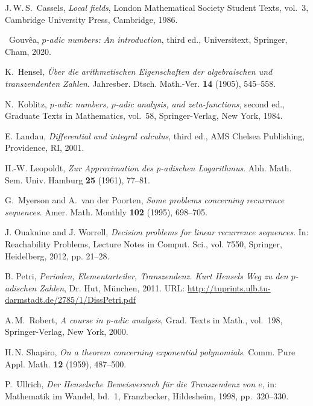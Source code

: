 \let\oldaddcontentsline\addcontentsline
\renewcommand{\addcontentsline}[3]{}
\begin{thebibliography}{11}



 {J.\,W.\,S.}~Cassels, \emph{Local fields}, London Mathematical Society Student Texts, vol.~3, Cambridge University Press, Cambridge, 1986.

~Gouv\^{e}a, \emph{{$p$}-adic numbers: An introduction}, third ed., Universitext, Springer, Cham, 2020.

 K.~Hensel,
\emph{Über die arithmetischen Eigenschaften der algebraischen und transzendenten Zahlen}. 
Jahresber. Dtsch. Math.-Ver. \textbf{14} (1905), 545--558. 

N.~Koblitz, \emph{{$p$}-adic numbers, {$p$}-adic analysis, and zeta-functions}, second ed., Graduate Texts in Mathematics, vol.~58, Springer-Verlag, New York, 1984. 



 E. Landau, \emph{Differential and integral calculus}, third ed., AMS Chelsea Publishing, Providence, RI, 2001.

 H.-W. Leopoldt, \emph{Zur Approximation des p-adischen Logarithmus}.
Abh. Math. Sem. Univ. Hamburg \textbf{25} (1961), 77--81.


 G.~Myerson and A.~van der Poorten, \emph{Some problems concerning recurrence sequences}.
Amer. Math. Monthly \textbf{102} (1995), 698--705.

J. Ouaknine and J. Worrell, \emph{Decision problems for linear recurrence sequences}. In: Reachability Problems, Lecture Notes in Comput. Sci., vol. 7550, Springer, Heidelberg, 2012, pp. 21--28.

B. Petri, \emph{Perioden, Elementarteiler, Transzendenz. Kurt Hensels Weg zu den \(p\)-adischen Zahlen}, Dr. Hut, M\"{u}nchen, 2011.  URL: \url{http://tuprints.ulb.tu-darmstadt.de/2785/1/DissPetri.pdf}

 {A.\,M.}~Robert, \emph{A course in p-adic analysis}, Grad. Texts in Math., vol.~198, Springer-Verlag, New York, 2000.  

 {H.\,N.} Shapiro,
\emph{On a theorem concerning exponential polynomials}. Comm. Pure Appl. Math. \textbf{12} (1959), 487--500.

 P.~Ullrich, \emph{Der Henselsche Beweisversuch f\"{u}r die Transzendenz von $e$}, in: Mathematik im Wandel, bd.\ 1, Franzbecker, Hildesheim, 1998, pp.\ 320--330.
\end{thebibliography}
\let\addcontentsline\oldaddcontentsline

